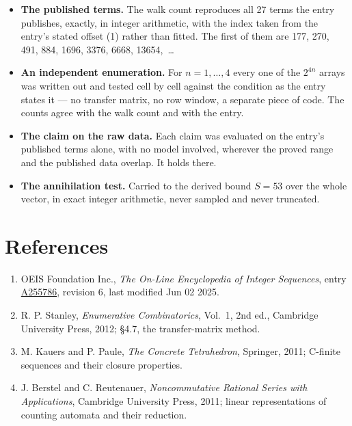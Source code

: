 \documentclass[11pt]{article}
\theoremstyle{definition}
\begin{document}
\begin{itemize}

\item {\bfseries The published terms.} The walk count reproduces all 27 terms the entry publishes, exactly, in integer arithmetic, with the index taken from the entry's stated offset (1) rather than fitted. The first of them are 177, 270, 491, 884, 1696, 3376, 6668, 13654,~\dots

\item {\bfseries An independent enumeration.} For $n = 1,\dots,4$ every one of the $2^{4n}$ arrays was written out and tested cell by cell against the condition as the entry states it --- no transfer matrix, no row window, a separate piece of code. The counts agree with the walk count and with the entry.

\item {\bfseries The claim on the raw data.} Each claim was evaluated on the entry's published terms alone, with no model involved, wherever the proved range and the published data overlap. It holds there.

\item {\bfseries The annihilation test.} Carried to the derived bound $S = 53$ over the whole vector, in exact integer arithmetic, never sampled and never truncated.

\end{itemize}

\section{References}

\begin{enumerate}

\item OEIS Foundation Inc., \emph{The On-Line Encyclopedia of Integer Sequences}, entry \href{https://oeis.org/A255786}{A255786}, revision 6, last modified Jun 02 2025.

\item R. P. Stanley, \emph{Enumerative Combinatorics}, Vol.~1, 2nd ed., Cambridge University Press, 2012; \S4.7, the transfer-matrix method.

\item M. Kauers and P. Paule, \emph{The Concrete Tetrahedron}, Springer, 2011; C-finite sequences and their closure properties.

\item J. Berstel and C. Reutenauer, \emph{Noncommutative Rational Series with Applications}, Cambridge University Press, 2011; linear representations of counting automata and their reduction.

\end{enumerate}
\end{document}
